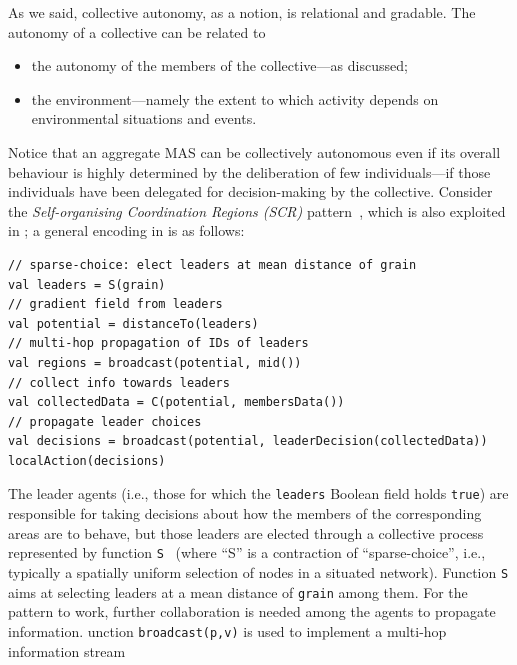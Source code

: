 As we said,
 collective autonomy, as a notion,
 is relational and gradable.
%
The autonomy of a collective can be related to
\begin{itemize}
\item the autonomy of the members of the collective---as discussed;
\item the environment---namely the extent to which activity depends on environmental situations and events.
\end{itemize}
%
Notice that an aggregate MAS can be collectively autonomous
 even if its overall behaviour
 is highly determined by the deliberation of few individuals---if those individuals have been delegated for decision-making by the collective.
%
Consider the \emph{Self-organising Coordination Regions (SCR)} pattern~\cite{casadei2019scr}, which is also exploited in ; a general encoding in \scafi{} is as follows:
%
\begin{lstlisting}
// sparse-choice: elect leaders at mean distance of grain
val leaders = S(grain)
// gradient field from leaders
val potential = distanceTo(leaders) 
// multi-hop propagation of IDs of leaders
val regions = broadcast(potential, mid())
// collect info towards leaders
val collectedData = C(potential, membersData())
// propagate leader choices
val decisions = broadcast(potential, leaderDecision(collectedData)) 
localAction(decisions)
\end{lstlisting}
%
The leader agents (i.e., those for which the \lstinline|leaders| Boolean field holds \lstinline|true|)
 are responsible for taking decisions
 about how the members of the corresponding areas
 are to behave,
 but those leaders are elected through a collective process
 represented by function \lstinline|S|~\cite{DBLP:conf/saso/MoBD18} (where ``S'' is a contraction of ``sparse-choice'', i.e., typically a spatially uniform selection of nodes in a situated network).
%
Function \lstinline|S| aims at selecting leaders at a mean distance of \lstinline|grain| among them.
%
For the pattern to work, further collaboration is needed among the agents to propagate information.
%
unction \lstinline|broadcast(p,v)| is used to implement a multi-hop information stream
